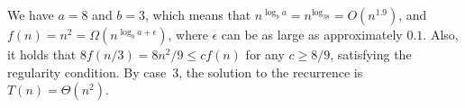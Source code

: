 We have $a=8$ and $b=3$, which means that $n^{\log_ba}=n^{\log_38}=O(n^{1.9})$, and $f(n)=n^2=\Omega(n^{\log_ba+\epsilon})$, where $\epsilon$ can be as large as approximately $0.1$.
Also, it holds that $8f(n/3)=8n^2\!/9\le cf(n)$ for any $c\ge8/9$, satisfying the regularity condition.
By case~3, the solution to the recurrence is $T(n)=\Theta(n^2)$.
